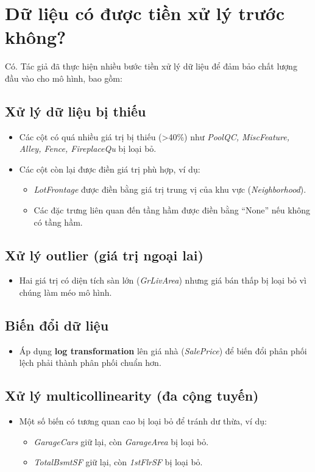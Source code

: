 \section{Dữ liệu có được tiền xử lý trước không?}
Có. Tác giả đã thực hiện nhiều bước tiền xử lý dữ liệu để đảm bảo chất lượng đầu vào cho mô hình, bao gồm:

\subsection{Xử lý dữ liệu bị thiếu}
\begin{itemize}
    \item Các cột có quá nhiều giá trị bị thiếu (>40\%) như \textit{PoolQC, MiscFeature, Alley, Fence, FireplaceQu} bị loại bỏ.
    \item Các cột còn lại được điền giá trị phù hợp, ví dụ:
    \begin{itemize}
        \item \textit{LotFrontage} được điền bằng giá trị trung vị của khu vực (\textit{Neighborhood}).
        \item Các đặc trưng liên quan đến tầng hầm được điền bằng ``None'' nếu không có tầng hầm.
    \end{itemize}
\end{itemize}

\subsection{Xử lý outlier (giá trị ngoại lai)}
\begin{itemize}
    \item Hai giá trị có diện tích sàn lớn (\textit{GrLivArea}) nhưng giá bán thấp bị loại bỏ vì chúng làm méo mô hình.
\end{itemize}

\subsection{Biến đổi dữ liệu}
\begin{itemize}
    \item Áp dụng \textbf{log transformation} lên giá nhà (\textit{SalePrice}) để biến đổi phân phối lệch phải thành phân phối chuẩn hơn.
\end{itemize}

\subsection{Xử lý multicollinearity (đa cộng tuyến)}
\begin{itemize}
    \item Một số biến có tương quan cao bị loại bỏ để tránh dư thừa, ví dụ:
    \begin{itemize}
        \item \textit{GarageCars} giữ lại, còn \textit{GarageArea} bị loại bỏ.
        \item \textit{TotalBsmtSF} giữ lại, còn \textit{1stFlrSF} bị loại bỏ.
    \end{itemize}
\end{itemize}


